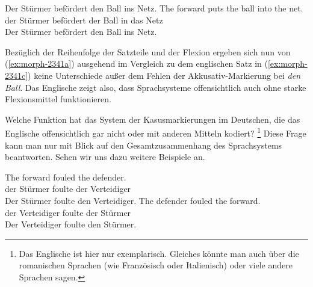 \enlargethispage{1\baselineskip}
\begin{exe}
  \ex\label{ex:morph2341}
  \begin{xlist}
    \ex\label{ex:morph-2341a} Der Stürmer befördert den Ball ins Netz.
    \ex\label{ex:morph-2341c} \gll The forward puts the ball into the net.\\
    der Stürmer befördert der Ball in das Netz\\
    \glt Der Stürmer befördert den Ball ins Netz.
  \end{xlist}
\end{exe}

Bezüglich der Reihenfolge der Satzteile und der Flexion ergeben sich nun von (\ref{ex:morph-2341a}) ausgehend im Vergleich zu dem englischen Satz in (\ref{ex:morph-2341c}) keine Unterschiede außer dem Fehlen der Akkusativ-Markierung bei \textit{den Ball}.
Das Englische zeigt also, dass Sprachsysteme offensichtlich auch ohne starke Flexionsmittel funktionieren.


Welche Funktion hat das System der Kasusmarkierungen im Deutschen, die das Englische offensichtlich gar nicht oder mit anderen Mitteln kodiert?%
\footnote{Das Englische ist hier nur exemplarisch.
Gleiches könnte man \zB auch über die romanischen Sprachen (wie Französisch oder Italienisch) oder viele andere Sprachen sagen.}
Diese Frage kann man nur mit Blick auf den Gesamtzusammenhang des Sprachsystems beantworten.
Sehen wir uns dazu weitere Beispiele an.

\begin{exe}
  \ex \label{ex:morph8934}
  \begin{xlist}
    \ex\label{ex:morph-8934e} \gll The forward fouled the defender.\\
    der Stürmer foulte der Verteidiger\\
    \glt Der Stürmer foulte den Verteidiger.
    \ex\label{ex:morph-8934f} \gll The defender fouled the forward.\\
    der Verteidiger foulte der Stürmer\\
    \glt Der Verteidiger foulte den Stürmer.
  \end{xlist}
\end{exe}

